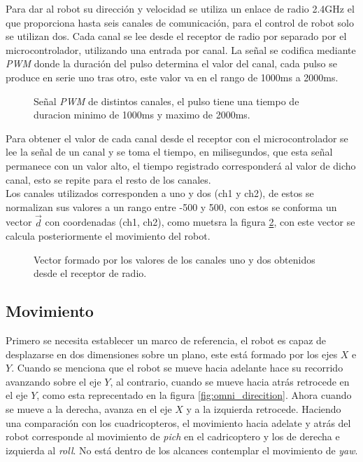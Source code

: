 \documentclass{iccmemoria}
\begin{document}
Para dar al robot su dirección y velocidad se utiliza un enlace de radio 2.4GHz el que proporciona hasta seis canales de comunicación, para el control de robot solo se utilizan dos. Cada canal se lee desde el receptor de radio por separado por el microcontrolador, utilizando una entrada por canal. La señal se codifica mediante \emph{PWM} donde la duración del pulso determina el valor del canal, cada pulso se produce en serie uno tras otro, este valor va en el rango de 1000ms a 2000ms.\\

\begin{figure}[H]
  \centering
  \selectfont{
  
  }
  \caption{Señal \emph{PWM} de distintos canales, el pulso tiene una tiempo de duracion minimo de 1000ms y maximo de 2000ms.}
  \label{fig:pwm}
\end{figure}

Para obtener el valor de cada canal desde el receptor con el microcontrolador se lee la señal de un canal y se toma el tiempo, en milisegundos, que esta señal permanece con un valor alto, el tiempo registrado corresponderá al valor de dicho canal, esto se repite para el resto de los canales.\\
 
Los canales utilizados corresponden a uno y dos (ch1 y ch2), de estos se normalizan sus valores a un rango entre -500 y 500, con estos se conforma un vector $\vec{d}$ con coordenadas (ch1, ch2), como muetsra la figura \ref{fig:radio_values}, con este vector se calcula posteriormente el movimiento del robot.\\

\begin{figure}[H]
  \centering
  \selectfont{
  
  }
  \caption{Vector formado por los valores de los canales uno y dos obtenidos desde el receptor de radio.}
  \label{fig:radio_values}
\end{figure}

\subsection{Movimiento}

Primero se necesita establecer un marco de referencia, el robot es capaz de desplazarse en dos dimensiones sobre un plano, este está formado por los ejes $X$ e $Y$. Cuando se menciona que el robot se mueve hacia adelante hace su recorrido avanzando sobre el eje $Y$, al contrario, cuando se mueve hacia atrás retrocede en el eje $Y$, como esta reprecentado en la figura \ref{fig:omni_direcition}. Ahora cuando se mueve a la derecha, avanza en el eje $X$ y a la izquierda retrocede. Haciendo una comparación con los cuadricopteros, el movimiento hacia adelate y atrás del robot corresponde al movimiento de \emph{pich} en el cadricoptero y los de derecha e izquierda al \emph{roll}. No está dentro de los alcances contemplar el movimiento de \emph{yaw}.\\
\end{document}

